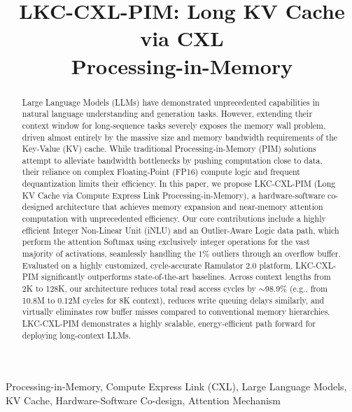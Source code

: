 \documentclass[10pt,conference]{IEEEtran}
\begin{document}
\title{LKC-CXL-PIM: Long KV Cache via CXL\\Processing-in-Memory}

\author{
}

\maketitle

\begin{abstract}
Large Language Models (LLMs) have demonstrated unprecedented capabilities in natural language understanding and generation tasks. However, extending their context window for long-sequence tasks severely exposes the memory wall problem, driven almost entirely by the massive size and memory bandwidth requirements of the Key-Value (KV) cache. While traditional Processing-in-Memory (PIM) solutions attempt to alleviate bandwidth bottlenecks by pushing computation close to data, their reliance on complex Floating-Point (FP16) compute logic and frequent dequantization limits their efficiency. In this paper, we propose LKC-CXL-PIM (Long KV Cache via Compute Express Link Processing-in-Memory), a hardware-software co-designed architecture that achieves memory expansion and near-memory attention computation with unprecedented efficiency. Our core contributions include a highly efficient Integer Non-Linear Unit (iNLU) and an Outlier-Aware Logic data path, which perform the attention Softmax using exclusively integer operations for the vast majority of activations, seamlessly handling the $1\%$ outliers through an overflow buffer. Evaluated on a highly customized, cycle-accurate Ramulator 2.0 platform, LKC-CXL-PIM significantly outperforms state-of-the-art baselines. Across context lengths from 2K to 128K, our architecture reduces total read access cycles by $\sim$98.9\% (e.g., from 10.8M to 0.12M cycles for 8K context), reduces write queuing delays similarly, and virtually eliminates row buffer misses compared to conventional memory hierarchies. LKC-CXL-PIM demonstrates a highly scalable, energy-efficient path forward for deploying long-context LLMs.
\end{abstract}

\begin{IEEEkeywords}
Processing-in-Memory, Compute Express Link (CXL), Large Language Models, KV Cache, Hardware-Software Co-design, Attention Mechanism
\end{IEEEkeywords}
\end{document}
